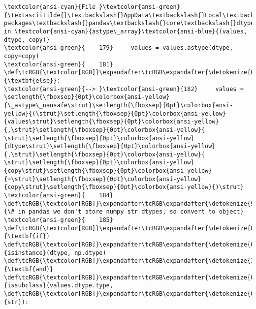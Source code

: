 \documentclass[11pt]{article}
\begin{document}
\begin{Verbatim}[commandchars=\\\{\}, frame=single, framerule=2mm, rulecolor=\color{outerrorbackground}]
\textcolor{ansi-cyan}{File }\textcolor{ansi-green}{\textasciitilde{}\textbackslash{}AppData\textbackslash{}Local\textbackslash{}Programs\textbackslash{}Python\textbackslash{}Python313\textbackslash{}Lib\textbackslash{}site-packages\textbackslash{}pandas\textbackslash{}core\textbackslash{}dtypes\textbackslash{}astype.py:182}, in \textcolor{ansi-cyan}{astype\_array}\textcolor{ansi-blue}{(values, dtype, copy)}
\textcolor{ansi-green}{    179}     values = values.astype(dtype, copy=copy)
\textcolor{ansi-green}{    181} \def\tcRGB{\textcolor[RGB]}\expandafter\tcRGB\expandafter{\detokenize{0,135,0}}{\textbf{else}}:
\textcolor{ansi-green}{--> }\textcolor{ansi-green}{182}     values = \setlength{\fboxsep}{0pt}\colorbox{ansi-yellow}{\_astype\_nansafe\strut}\setlength{\fboxsep}{0pt}\colorbox{ansi-yellow}{(\strut}\setlength{\fboxsep}{0pt}\colorbox{ansi-yellow}{values\strut}\setlength{\fboxsep}{0pt}\colorbox{ansi-yellow}{,\strut}\setlength{\fboxsep}{0pt}\colorbox{ansi-yellow}{ \strut}\setlength{\fboxsep}{0pt}\colorbox{ansi-yellow}{dtype\strut}\setlength{\fboxsep}{0pt}\colorbox{ansi-yellow}{,\strut}\setlength{\fboxsep}{0pt}\colorbox{ansi-yellow}{ \strut}\setlength{\fboxsep}{0pt}\colorbox{ansi-yellow}{copy\strut}\setlength{\fboxsep}{0pt}\colorbox{ansi-yellow}{=\strut}\setlength{\fboxsep}{0pt}\colorbox{ansi-yellow}{copy\strut}\setlength{\fboxsep}{0pt}\colorbox{ansi-yellow}{)\strut}
\textcolor{ansi-green}{    184} \def\tcRGB{\textcolor[RGB]}\expandafter\tcRGB\expandafter{\detokenize{95,135,135}}{\# in pandas we don't store numpy str dtypes, so convert to object}
\textcolor{ansi-green}{    185} \def\tcRGB{\textcolor[RGB]}\expandafter\tcRGB\expandafter{\detokenize{0,135,0}}{\textbf{if}} \def\tcRGB{\textcolor[RGB]}\expandafter\tcRGB\expandafter{\detokenize{0,135,0}}{isinstance}(dtype, np.dtype) \def\tcRGB{\textcolor[RGB]}\expandafter\tcRGB\expandafter{\detokenize{175,0,255}}{\textbf{and}} \def\tcRGB{\textcolor[RGB]}\expandafter\tcRGB\expandafter{\detokenize{0,135,0}}{issubclass}(values.dtype.type, \def\tcRGB{\textcolor[RGB]}\expandafter\tcRGB\expandafter{\detokenize{0,135,0}}{str}):


\end{Verbatim}
\end{document}
